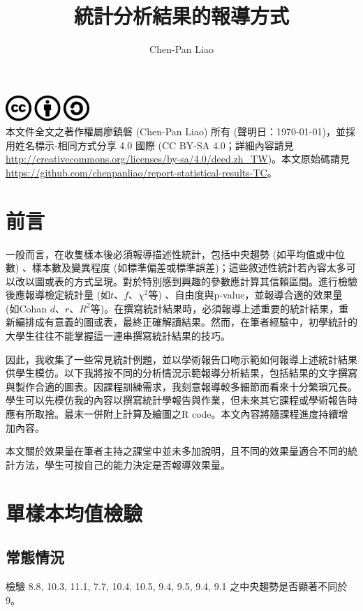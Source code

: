 \documentclass[12pt, a4paper, onecolumn]{article}
\title{統計分析結果的報導方式}
\author{Chen-Pan Liao}
\begin{document}
\maketitle

{\centering\includegraphics[width=1.25in]{cc.pdf}\\[-0pt]}
\noindent 本文件全文之著作權屬廖鎮磐 (Chen-Pan Liao) 所有 (聲明日：\today)，並採用姓名標示-相同方式分享 4.0 國際 (CC BY-SA 4.0；詳細內容請見 \url{http://creativecommons.org/licenses/by-sa/4.0/deed.zh_TW})。本文原始碼請見 \url{https://github.com/chenpanliao/report-statistical-results-TC}。
\vspace{3ex}

\tableofcontents

\section{前言}
一般而言，在收隻樣本後必須報導描述性統計，包括中央趨勢 (如平均值或中位數) 、樣本數及變異程度 (如標準偏差或標準誤差)；這些敘述性統計若內容太多可以改以圖或表的方式呈現。對於特別感到興趣的參數應計算其信賴區間。進行檢驗後應報導檢定統計量 (如$t$、$f$、$\chi^2$等) 、自由度與p-value，並報導合適的效果量 (如Cohan $d$、$r$、$R^2$等)。在撰寫統計結果時，必須報導上述重要的統計結果，重新編排成有意義的圖或表，最終正確解讀結果。然而，在筆者經驗中，初學統計的大學生往往不能掌握這一連串撰寫統計結果的技巧。

因此，我收集了一些常見統計例題，並以學術報告口吻示範如何報導上述統計結果供學生模仿。以下我將按不同的分析情況示範報導分析結果，包括結果的文字撰寫與製作合適的圖表。因課程訓練需求，我刻意報導較多細節而看來十分繁瑣冗長。學生可以先模仿我的內容以撰寫統計學報告與作業，但未來其它課程或學術報告時應有所取捨。最末一併附上計算及繪圖之R code。本文內容將隨課程進度持續增加內容。

本文關於效果量在筆者主持之課堂中並未多加說明，且不同的效果量適合不同的統計方法，學生可按自己的能力決定是否報導效果量。


\section{單樣本均值檢驗}
\subsection{常態情況}
檢驗 8.8, 10.3, 11.1, 7.7, 10.4, 10.5, 9.4, 9.5, 9.4, 9.1 之中央趨勢是否顯著不同於9。
\end{document}
